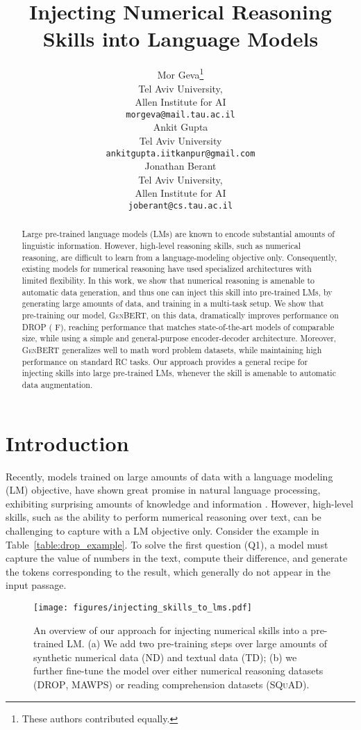 \documentclass[11pt,a4paper]{article}
\author{Mor Geva\thanks{These authors contributed equally.} \\
  Tel Aviv University, \\
  Allen Institute for AI \\
  {\tt morgeva@mail.tau.ac.il} \\\And
  Ankit Gupta\footnotemark[1] \\
  Tel Aviv University \\
  {\tt ankitgupta.iitkanpur@gmail.com} \\\AND
  Jonathan Berant \\
  Tel Aviv University, \\
  Allen Institute for AI \\
  {\tt joberant@cs.tau.ac.il} \\}
\title{Injecting Numerical Reasoning Skills into Language Models}
\date{}
\newcommand\genbert{\textsc{GenBERT}}
\newcommand\drop{\textsc{DROP}}
\newcommand\squad{\textsc{SQuAD}}
\begin{document}
\maketitle

\begin{abstract}
Large pre-trained language models (LMs) are known to encode
  substantial amounts of linguistic information. However, high-level reasoning
  skills, such as numerical reasoning, are difficult to learn from a
  language-modeling objective only. Consequently, existing models for numerical reasoning
  have used specialized architectures with limited flexibility. In this work, we
  show that numerical reasoning is amenable to automatic data generation, and thus one can inject this skill into pre-trained LMs, by generating large amounts of data, and training in
  a multi-task setup. 
  We show that pre-training our model, \genbert{}, on this data, dramatically improves performance on \drop{} ( F), reaching performance that matches state-of-the-art models of comparable size, while using a simple and general-purpose encoder-decoder architecture. Moreover, \genbert{} generalizes well to math word problem datasets, while maintaining high performance on standard RC tasks. Our approach provides a general recipe for injecting skills into large pre-trained LMs, whenever the skill is amenable to automatic data augmentation.
\end{abstract}
 \section{Introduction}
Recently, models trained on large amounts of data with a language modeling (LM) objective, have shown great promise in natural language processing, exhibiting surprising amounts of knowledge and information \cite{peters2018elmo, devlin2018bert, liu2019roberta, lan2019albert, petroni2019language, hewitt2019structural}. However, high-level skills, such as the ability to perform numerical reasoning over text, can be challenging to capture with a LM objective only. Consider the example in Table~\ref{table:drop_example}. To solve the first question (Q1), a model must capture the value of numbers in the text, compute their difference, and generate the tokens corresponding to the result, which generally do not appear in the input passage.

\begin{figure}\setlength{\belowcaptionskip}{-18pt}
    \centering
    \texttt{[image: figures/injecting\_skills\_to\_lms.pdf]}
    \caption{An overview of our approach for injecting numerical skills into a pre-trained LM. (a) We add two pre-training steps over large amounts of synthetic numerical data (ND) and textual data (TD); (b) we further fine-tune the model over either numerical reasoning datasets (\drop, \textsc{MAWPS}) or reading comprehension datasets (\squad).}
    \label{figure:intro}
\end{figure}
\end{document}
